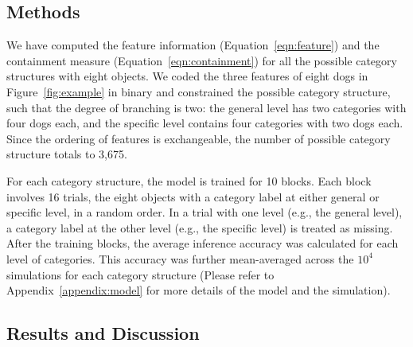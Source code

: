 \documentclass[doc]{apa6}
\DeclareMathOperator*{\argmin}{arg\,min}
\begin{document}



\subsection*{Methods}

We have computed the feature information (Equation~\ref{eqn:feature}) and the containment measure
(Equation~\ref{eqn:containment}) for all the possible category structures with eight objects.  We
coded the three features of eight dogs in Figure~\ref{fig:example} in binary and constrained the
possible category structure, such that the degree of branching is two: the general level has two
categories with four dogs each, and the specific level contains four categories with two dogs each.
Since the ordering of features is exchangeable, the number of possible category structure totals to
3,675.

For each category structure, the model is trained for 10 blocks. Each block involves 16 trials, the
eight objects with a category label at either general or specific level, in a random order.  In a trial
with one level (e.g., the general level), a category label at the other level (e.g., the specific level)
is treated as missing.  After the training blocks, the average inference accuracy was calculated for
each level of categories.  This accuracy was further mean-averaged across the $10^{4}$ simulations
for each category structure (Please refer to Appendix~\ref{appendix:model} for more details of the
    model and the simulation).


\subsection*{Results and Discussion}
\end{document}
